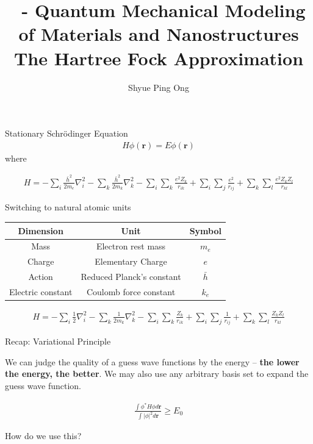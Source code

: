 \documentclass[aspectratio=169]{beamer}
\title[\classname The Hartree Fock Approximation]{\classname~- Quantum Mechanical Modeling of Materials and Nanostructures\\The Hartree Fock Approximation}
\author{Shyue Ping Ong}
\institute[UCSD]{University of California, San Diego\\
\medskip
}
\date{\classyear} %
\let \vec \mathbf
\begin{document}
\begin{frame}
    \titlepage %
\end{frame}

\begin{frame}{Stationary Schr\"odinger Equation}
\begin{eqnarray*}
    H\phi(\vec{r}) = E\phi(\vec{r}) 
\end{eqnarray*}
where

\begin{eqnarray*}
    H = -\sum_i \frac{\bar{h}^2}{2m_e}\nabla_i^2
    -\sum_k \frac{\bar{h}^2}{2m_k}\nabla_k^2
    -\sum_i\sum_k \frac{e^2Z_k}{r_{ik}}
    +\sum_i\sum_j \frac{e^2}{r_{ij}}
    +\sum_k\sum_l \frac{e^2Z_kZ_l}{r_{kl}}
\end{eqnarray*}
 \end{frame}

\begin{frame}{Switching to natural atomic units}
\begin{table}[]
    \centering
    \begin{tabular}{ccc}
        \textbf{Dimension} & \textbf{Unit} & \textbf{Symbol }\\
        \hline
        Mass & Electron rest mass & $m_e$\\
        Charge & Elementary Charge & $e$\\
        Action & Reduced Planck's constant & $\bar{h}$\\
        Electric constant & Coulomb force constant & $k_e$
    \end{tabular}
\end{table}

\begin{eqnarray*}
    H = -\sum_i \frac{1}{2}\nabla_i^2
    -\sum_k \frac{1}{2m_k}\nabla_k^2
    -\sum_i\sum_k \frac{Z_k}{r_{ik}}
    +\sum_i\sum_j \frac{1}{r_{ij}}
    +\sum_k\sum_l \frac{Z_kZ_l}{r_{kl}}
\end{eqnarray*}
    
\end{frame}

\begin{frame}{Recap: Variational Principle}

We can judge the quality of a guess wave functions by the energy – \textbf{the lower the energy, the better}. We may also use any arbitrary basis set to expand the guess wave function.

    \begin{eqnarray*}
    \frac{\int \phi^* H \phi d\vec{r}}{\int |\phi|^2 d\vec{r}} \geq E_0
    \end{eqnarray*}

How do we use this?
\end{frame}
\end{document}
